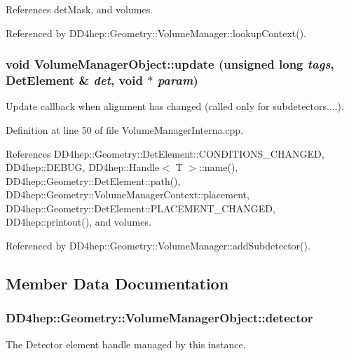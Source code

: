 References detMask, and volumes.

Referenced by DD4hep::Geometry::VolumeManager::lookupContext().\hypertarget{class_d_d4hep_1_1_geometry_1_1_volume_manager_object_a61234dfd7ac8a594ec2c9a0dcb6a274d}{
\subsubsection[{update}]{\setlength{\rightskip}{0pt plus 5cm}void VolumeManagerObject::update (unsigned long {\em tags}, \/  {\bf DetElement} \& {\em det}, \/  void $\ast$ {\em param})}}
\label{class_d_d4hep_1_1_geometry_1_1_volume_manager_object_a61234dfd7ac8a594ec2c9a0dcb6a274d}


Update callback when alignment has changed (called only for subdetectors....). 

Definition at line 50 of file VolumeManagerInterna.cpp.

References DD4hep::Geometry::DetElement::CONDITIONS\_\-CHANGED, DD4hep::DEBUG, DD4hep::Handle$<$ T $>$::name(), DD4hep::Geometry::DetElement::path(), DD4hep::Geometry::VolumeManagerContext::placement, DD4hep::Geometry::DetElement::PLACEMENT\_\-CHANGED, DD4hep::printout(), and volumes.

Referenced by DD4hep::Geometry::VolumeManager::addSubdetector().

\subsection{Member Data Documentation}
\hypertarget{class_d_d4hep_1_1_geometry_1_1_volume_manager_object_a998bff824dead1dfec1642f57eae9117}{
\subsubsection[{detector}]{ {\bf DD4hep::Geometry::VolumeManagerObject::detector}}}
\label{class_d_d4hep_1_1_geometry_1_1_volume_manager_object_a998bff824dead1dfec1642f57eae9117}


The Detector element handle managed by this instance. 

